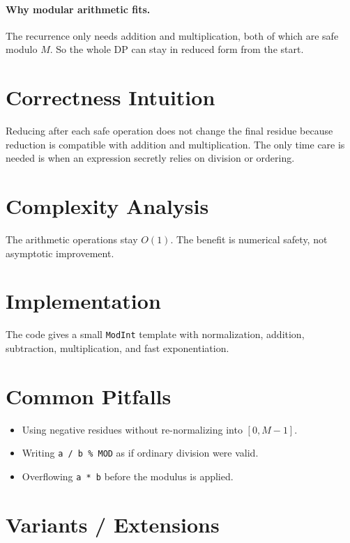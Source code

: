 \paragraph{Why modular arithmetic fits.}
The recurrence only needs addition and multiplication, both of which are safe modulo \(M\). So the whole DP can stay in
reduced form from the start.

\section*{Correctness Intuition}

Reducing after each safe operation does not change the final residue because reduction is compatible with addition and
multiplication. The only time care is needed is when an expression secretly relies on division or ordering.

\section*{Complexity Analysis}

The arithmetic operations stay \(O(1)\). The benefit is numerical safety, not asymptotic improvement.

\section*{Implementation}

The code gives a small \texttt{ModInt} template with normalization, addition, subtraction, multiplication, and fast
exponentiation.

\section*{Common Pitfalls}

\begin{itemize}
  \item Using negative residues without re-normalizing into \([0, M-1]\).
  \item Writing \texttt{a / b \% MOD} as if ordinary division were valid.
  \item Overflowing \texttt{a * b} before the modulus is applied.
\end{itemize}

\section*{Variants / Extensions}

